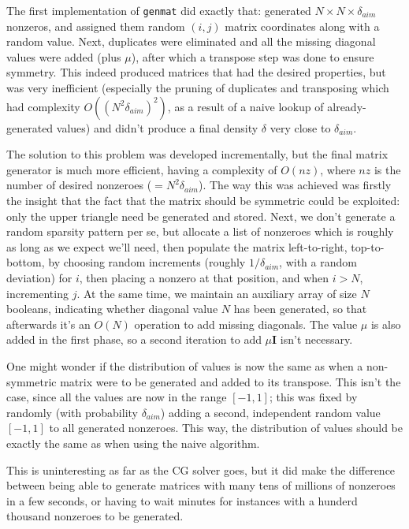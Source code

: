 \documentclass[a4paper]{article}
\newcommand{\mat}[1]{\ensuremath{\boldsymbol{#1}}}
\begin{document}
The first implementation of \texttt{genmat} did exactly that: generated $N\times N \times \delta_{aim}$
nonzeros, and assigned them random $(i,j)$ matrix coordinates along with a random value. Next, duplicates
were eliminated and all the missing diagonal values were added (plus $\mu$), after which a transpose step
was done to ensure symmetry. This indeed produced matrices that had the desired properties, but
was very inefficient (especially the pruning of duplicates and
transposing which had complexity $O( (N^2\delta_{aim})^2 )$, as a result of a naive lookup of already-generated values)
and didn't produce a final density $\delta$ very close to $\delta_{aim}$.

The solution to this problem was developed incrementally, but the final matrix generator is much more efficient,
having a complexity of $O(nz)$, where $nz$ is the number of desired nonzeroes ($=N^2\delta_{aim}$). The way this
was achieved was firstly the insight that the fact that the matrix should be symmetric could be exploited: only
the upper triangle need be generated and stored. Next, we don't generate a random sparsity pattern per se, but allocate
a list of nonzeroes which is roughly as long as we expect we'll need, then populate the matrix left-to-right, top-to-bottom,
by choosing random increments (roughly $1/\delta_{aim}$, with a random
deviation) for $i$, then placing a nonzero at that position, and when $i>N$,
incrementing $j$. At the same time, we maintain an auxiliary array of size $N$ booleans,
indicating whether diagonal value $N$ has been generated, so that afterwards it's an $O(N)$ operation
to add missing diagonals. The value $\mu$ is also added in the first phase, so a second iteration to add $\mu\mat I$ isn't
necessary.

One might wonder if the distribution of values is now the same as when a non-symmetric matrix were
to be generated and added to its transpose. This isn't the case, since all the values are now in the
range $[-1,1]$; this was fixed by randomly (with probability $\delta_{aim}$) adding a second, independent random
value $[-1,1]$ to all generated nonzeroes. This way, the distribution of values should be exactly the same as when
using the naive algorithm.

This is uninteresting as far as the CG solver goes, but it did make the difference between being able to generate matrices
with many tens of millions of nonzeroes in a few seconds, or having to wait minutes for instances with a hunderd thousand
nonzeroes to be generated.
\end{document}
